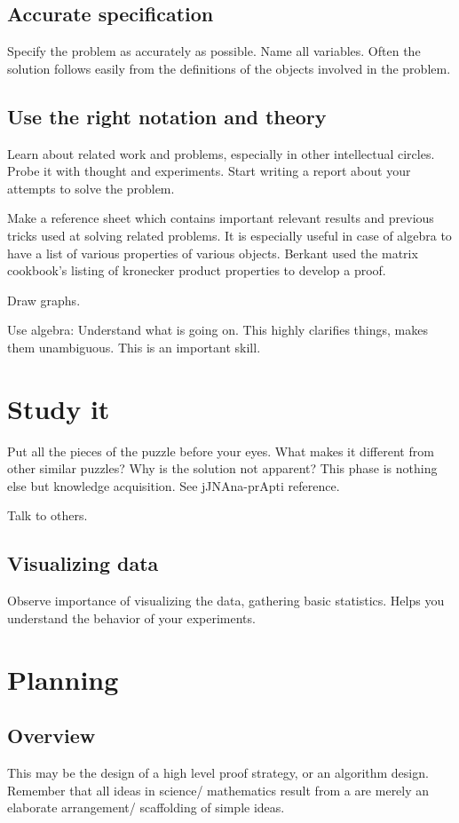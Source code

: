 \documentclass[oneside, article]{memoir}
\begin{document}
\subsection{Accurate specification}
Specify the problem as accurately as possible. Name all variables. Often the solution follows easily from the definitions of the objects involved in the problem.

\subsection{Use the right notation and theory}
Learn about related work and problems, especially in other intellectual circles. Probe it with thought and experiments. Start writing a report about your attempts to solve the problem.

Make a reference sheet which contains important relevant results and previous tricks used at solving related problems. It is especially useful in case of algebra to have a list of various properties of various objects. Berkant used the matrix cookbook's listing of kronecker product properties to develop a proof.

Draw graphs.

Use algebra: Understand what is going on. This highly clarifies things, makes them unambiguous. This is an important skill.

\section{Study it}
Put all the pieces of the puzzle before your eyes. What makes it different from other similar puzzles? Why is the solution not apparent? This phase is nothing else but knowledge acquisition. See jJNAna-prApti reference.

Talk to others.

\subsection{Visualizing data}
Observe importance of visualizing the data, gathering basic statistics. Helps you understand the behavior of your experiments.

\section{Planning}
\subsection{Overview}
This may be the design of a high level proof strategy, or an algorithm design. Remember that all ideas in science/ mathematics result from a are merely an elaborate arrangement/ scaffolding of simple ideas.
\end{document}
